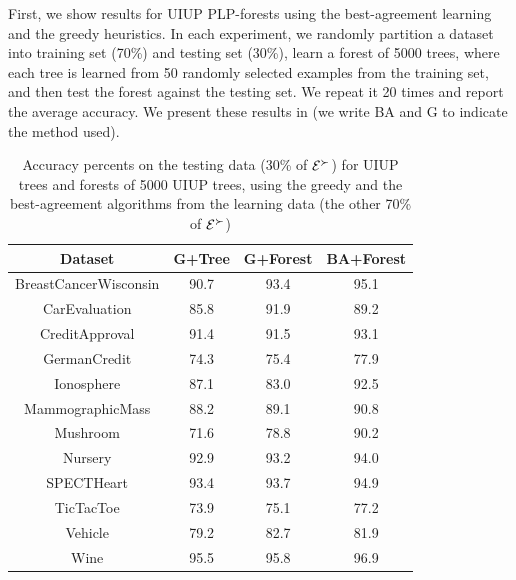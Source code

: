 First, we show results for UIUP PLP-forests using the best-agreement learning
and the greedy heuristics.
In each experiment, we randomly partition a dataset into training
set (70\%) and testing set (30\%), learn a forest of 5000 trees, where
each tree is learned from 50 randomly selected examples from the
training set, and then test the forest against the testing set.
We repeat it 20 times and report the average accuracy.
We present these results in  (we write BA and G to indicate the method used).

\begin{table}
  \centering
  \small
  \begin{tabular}{ |c||c|c|c| }
    \hline
    Dataset          & G+Tree & G+Forest & BA+Forest\\
    \hline \hline
    BreastCancerWisconsin              & 90.7   & 93.4     & 95.1 \\ \hline
    CarEvaluation               & 85.8   & 91.9     & 89.2 \\ \hline      
    CreditApproval               & 91.4   & 91.5     & 93.1 \\ \hline       
    GermanCredit               & 74.3   & 75.4     & 77.9 \\ \hline     
    Ionosphere               & 87.1   & 83.0     & 92.5 \\ \hline   
    MammographicMass               & 88.2   & 89.1     & 90.8 \\ \hline         
    Mushroom               & 71.6   & 78.8     & 90.2 \\ \hline 
    Nursery               & 92.9   & 93.2     & 94.0 \\ \hline
    SPECTHeart               & 93.4   & 93.7     & 94.9 \\ \hline   
    TicTacToe              & 73.9   & 75.1     & 77.2 \\ \hline 
    Vehicle               & 79.2   & 82.7     & 81.9 \\ \hline
    Wine               & 95.5   & 95.8     & 96.9 \\ \hline
  \end{tabular}
  \caption{Accuracy percents on the testing data (30\% of $\mathcal{E}^\succ$)
					 for UIUP trees and forests of 5000 UIUP trees, 
					 using the greedy and the best-agreement algorithms from the learning 
					 data (the other 70\% of $\mathcal{E}^\succ$)}
  \label{tbl:forests1}
\end{table}

